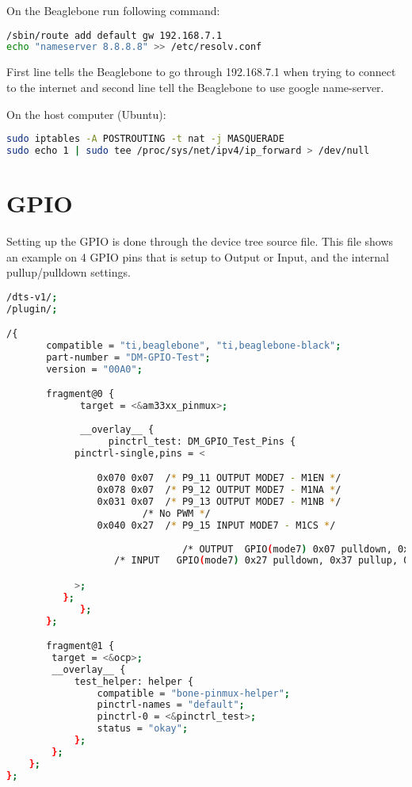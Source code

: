\noindent
On the Beaglebone run following command:
\begin{lstlisting}[language=bash]
/sbin/route add default gw 192.168.7.1
echo "nameserver 8.8.8.8" >> /etc/resolv.conf
\end{lstlisting}
First line tells the Beaglebone to go through 192.168.7.1 when trying to connect to the internet and second line tell the Beaglebone to use google name-server.

\noindent
On the host computer (Ubuntu): 
\begin{lstlisting}[language=bash]
sudo iptables -A POSTROUTING -t nat -j MASQUERADE
sudo echo 1 | sudo tee /proc/sys/net/ipv4/ip_forward > /dev/null
\end{lstlisting}

\section{GPIO}
Setting up the GPIO is done through the device tree source file. This file shows an example on 4 GPIO pins that is setup to Output or Input, and the internal pullup/pulldown settings. 

\begin{lstlisting}[language=bash]
/dts-v1/;
/plugin/;

/{
       compatible = "ti,beaglebone", "ti,beaglebone-black";
       part-number = "DM-GPIO-Test";
       version = "00A0";

       fragment@0 {
             target = <&am33xx_pinmux>;
            
             __overlay__ {
                  pinctrl_test: DM_GPIO_Test_Pins {
			pinctrl-single,pins = <

				0x070 0x07  /* P9_11 OUTPUT MODE7 - M1EN */
				0x078 0x07  /* P9_12 OUTPUT MODE7 - M1NA */
				0x031 0x07  /* P9_13 OUTPUT MODE7 - M1NB */
					    /* No PWM */
				0x040 0x27  /* P9_15 INPUT MODE7 - M1CS */
				
                               /* OUTPUT  GPIO(mode7) 0x07 pulldown, 0x17 pullup, 0x?f no pullup/down */
			       /* INPUT   GPIO(mode7) 0x27 pulldown, 0x37 pullup, 0x?f no pullup/down */

			>;
		  };
             };
       };

       fragment@1 {
		target = <&ocp>;
		__overlay__ {
			test_helper: helper {
				compatible = "bone-pinmux-helper";
				pinctrl-names = "default";
				pinctrl-0 = <&pinctrl_test>;
				status = "okay";
			};
		};
	};
};
\end{lstlisting}

